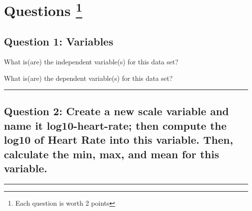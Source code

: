 \documentclass[11pt,]{article}
\begin{document}
\hypertarget{questions}{%
\section[Questions ]{\texorpdfstring{Questions
\footnote{Each question is worth 2 points}}{Questions }}\label{questions}}

\hypertarget{question-1-variables}{%
\subsection{\texorpdfstring{\textbf{Question 1}:
Variables}{Question 1: Variables}}\label{question-1-variables}}

What is(are) the independent variable(s) for this data set?

What is(are) the dependent variable(s) for this data set?

\begin{center}\rule{0.5\linewidth}{0.5pt}\end{center}

\hypertarget{question-2-create-a-new-scale-variable-and-name-it-log10-heart-rate-then-compute-the-log10-of-heart-rate-into-this-variable.-then-calculate-the-min-max-and-mean-for-this-variable.}{%
\subsection{\texorpdfstring{\textbf{Question 2}: Create a new
\textbf{scale} variable and name it \textbf{log10-heart-rate}; then
compute the log10 of \textbf{Heart Rate} into this variable. Then,
calculate the min, max, and mean for this
variable.}{Question 2: Create a new scale variable and name it log10-heart-rate; then compute the log10 of Heart Rate into this variable. Then, calculate the min, max, and mean for this variable.}}\label{question-2-create-a-new-scale-variable-and-name-it-log10-heart-rate-then-compute-the-log10-of-heart-rate-into-this-variable.-then-calculate-the-min-max-and-mean-for-this-variable.}}

\begin{center}\rule{0.5\linewidth}{0.5pt}\end{center}
\end{document}
